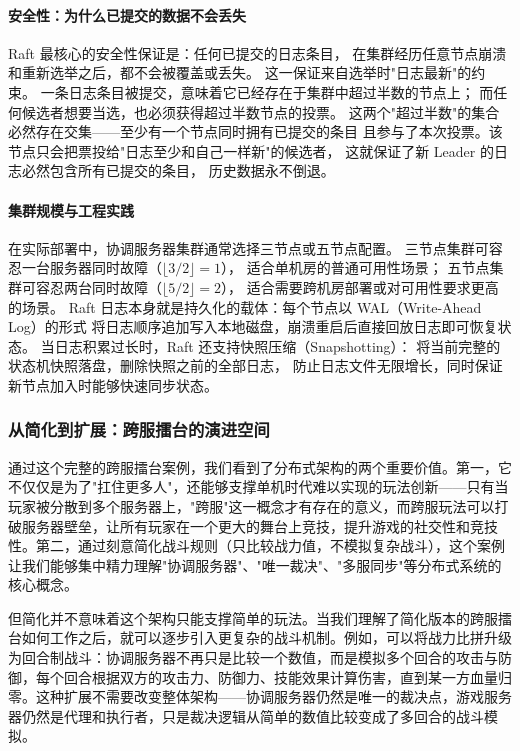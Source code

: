 \paragraph{安全性：为什么已提交的数据不会丢失}

Raft 最核心的安全性保证是：任何已提交的日志条目，
在集群经历任意节点崩溃和重新选举之后，都不会被覆盖或丢失。
这一保证来自选举时"日志最新"的约束。
一条日志条目被提交，意味着它已经存在于集群中超过半数的节点上；
而任何候选者想要当选，也必须获得超过半数节点的投票。
这两个"超过半数"的集合必然存在交集——至少有一个节点同时拥有已提交的条目
且参与了本次投票。该节点只会把票投给"日志至少和自己一样新"的候选者，
这就保证了新 Leader 的日志必然包含所有已提交的条目，
历史数据永不倒退。

\paragraph{集群规模与工程实践}

在实际部署中，协调服务器集群通常选择三节点或五节点配置。
三节点集群可容忍一台服务器同时故障（$\lfloor 3/2 \rfloor = 1$），
适合单机房的普通可用性场景；
五节点集群可容忍两台同时故障（$\lfloor 5/2 \rfloor = 2$），
适合需要跨机房部署或对可用性要求更高的场景。
Raft 日志本身就是持久化的载体：每个节点以 WAL（Write-Ahead Log）的形式
将日志顺序追加写入本地磁盘，崩溃重启后直接回放日志即可恢复状态。
当日志积累过长时，Raft 还支持快照压缩（Snapshotting）：
将当前完整的状态机快照落盘，删除快照之前的全部日志，
防止日志文件无限增长，同时保证新节点加入时能够快速同步状态。


\subsubsection{从简化到扩展：跨服擂台的演进空间}

通过这个完整的跨服擂台案例，我们看到了分布式架构的两个重要价值。第一，它不仅仅是为了"扛住更多人"，还能够支撑单机时代难以实现的玩法创新——只有当玩家被分散到多个服务器上，"跨服"这一概念才有存在的意义，而跨服玩法可以打破服务器壁垒，让所有玩家在一个更大的舞台上竞技，提升游戏的社交性和竞技性。第二，通过刻意简化战斗规则（只比较战力值，不模拟复杂战斗），这个案例让我们能够集中精力理解"协调服务器"、"唯一裁决"、"多服同步"等分布式系统的核心概念。

但简化并不意味着这个架构只能支撑简单的玩法。当我们理解了简化版本的跨服擂台如何工作之后，就可以逐步引入更复杂的战斗机制。例如，可以将战力比拼升级为回合制战斗：协调服务器不再只是比较一个数值，而是模拟多个回合的攻击与防御，每个回合根据双方的攻击力、防御力、技能效果计算伤害，直到某一方血量归零。这种扩展不需要改变整体架构——协调服务器仍然是唯一的裁决点，游戏服务器仍然是代理和执行者，只是裁决逻辑从简单的数值比较变成了多回合的战斗模拟。

